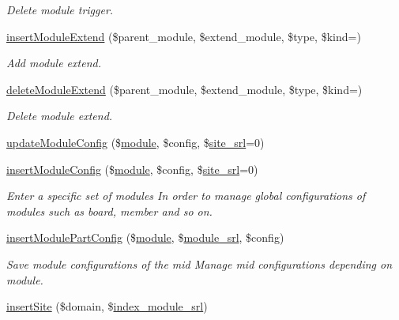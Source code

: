 \begin{DoxyCompactItemize}
\begin{DoxyCompactList}\small\item\em Delete module trigger. \end{DoxyCompactList}\item 
\hyperlink{classmoduleController_a74076ed057c3d3671a364fa478aa1109}{insert\+Module\+Extend} (\$parent\+\_\+module, \$extend\+\_\+module, \$type, \$kind=\textquotesingle{}\textquotesingle{})
\begin{DoxyCompactList}\small\item\em Add module extend. \end{DoxyCompactList}\item 
\hyperlink{classmoduleController_a74f94763f4e60fef8a0e4e4dabf777e0}{delete\+Module\+Extend} (\$parent\+\_\+module, \$extend\+\_\+module, \$type, \$kind=\textquotesingle{}\textquotesingle{})
\begin{DoxyCompactList}\small\item\em Delete module extend. \end{DoxyCompactList}\item 
\hyperlink{classmoduleController_aa6d6239d1fd7c1f64f7061778ad4127b}{update\+Module\+Config} (\$\hyperlink{classmodule}{module}, \$config, \$\hyperlink{ko_8install_8php_a8b1406b4ad1048041558dce6bfe89004}{site\+\_\+srl}=0)
\item 
\hyperlink{classmoduleController_a678c87caaf6b2d12e63237d87b11b7a9}{insert\+Module\+Config} (\$\hyperlink{classmodule}{module}, \$config, \$\hyperlink{ko_8install_8php_a8b1406b4ad1048041558dce6bfe89004}{site\+\_\+srl}=0)
\begin{DoxyCompactList}\small\item\em Enter a specific set of modules In order to manage global configurations of modules such as board, member and so on. \end{DoxyCompactList}\item 
\hyperlink{classmoduleController_a7def19c7b7f3f3e0d97a2183d58d62eb}{insert\+Module\+Part\+Config} (\$\hyperlink{classmodule}{module}, \$\hyperlink{ko_8install_8php_a370bb6450fab1da3e0ed9f484a38b761}{module\+\_\+srl}, \$config)
\begin{DoxyCompactList}\small\item\em Save module configurations of the mid Manage mid configurations depending on module. \end{DoxyCompactList}\item 
\hyperlink{classmoduleController_acca9e2ce3fbb24f614816bb4c34a5506}{insert\+Site} (\$domain, \$\hyperlink{ko_8install_8php_acd0b17bfe6d14c82871d73fa39c9c22d}{index\+\_\+module\+\_\+srl})

\end{DoxyCompactItemize}
